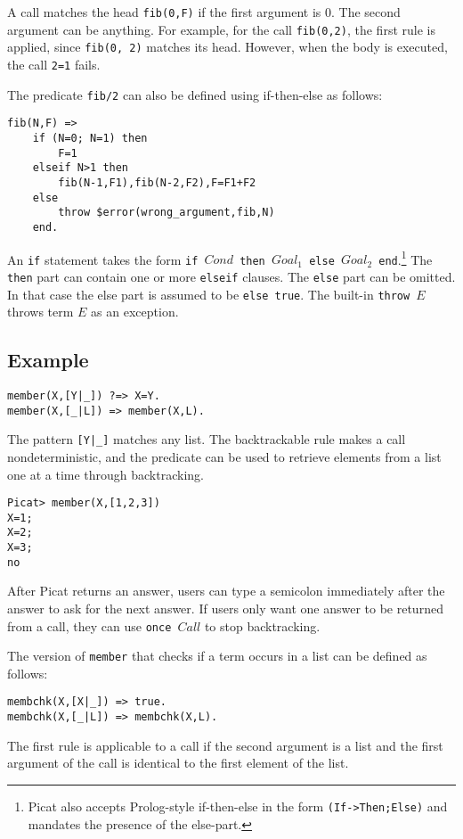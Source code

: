 A call matches the head \texttt{fib(0,F)} if the first argument is 0. The second argument can be anything. For example, for the call \texttt{fib(0,2)}, the first rule is applied, since \texttt{fib(0, 2)} matches its head. However, when the body is executed, the call \texttt{2=1} fails.  

The predicate \texttt{fib/2} can also be defined using if-then-else as follows:
\begin{verbatim}
fib(N,F) => 
    if (N=0; N=1) then 
        F=1 
    elseif N>1 then 
        fib(N-1,F1),fib(N-2,F2),F=F1+F2
    else 
        throw $error(wrong_argument,fib,N)
    end.
\end{verbatim}
An \texttt{if} statement takes the form \texttt{if $Cond$ then $Goal_1$ else $Goal_2$ end}.\footnote{Picat also accepts Prolog-style if-then-else in the form \texttt{(If->Then;Else)} and mandates the presence of the else-part.} The \texttt{then} part can contain one or more \texttt{elseif} clauses. The \texttt{else} part can be omitted. In that case the else part is assumed to be \texttt{else true}. The built-in \texttt{throw $E$} throws term $E$ as an exception.

\subsection*{Example}
\begin{verbatim}
member(X,[Y|_]) ?=> X=Y.
member(X,[_|L]) => member(X,L).
\end{verbatim}

The pattern \verb+[Y|_]+ matches any list. The backtrackable rule makes a call nondeterministic, and the predicate can be used to retrieve elements from a list one at a time through backtracking.
\begin{verbatim}
Picat> member(X,[1,2,3])
X=1;
X=2;
X=3;
no
\end{verbatim}
After Picat returns an answer, users can type a semicolon immediately after the answer to ask for the next answer. If users only want one answer to be returned from a call, they can use \texttt{once $Call$} to stop backtracking.

The version of \texttt{member} that checks if a term occurs in a list can be defined as follows:
\begin{verbatim}
membchk(X,[X|_]) => true.
membchk(X,[_|L]) => membchk(X,L).
\end{verbatim}
The first rule is applicable to a call if the second argument is a list and the first argument of the call is identical to the first element of the list.

